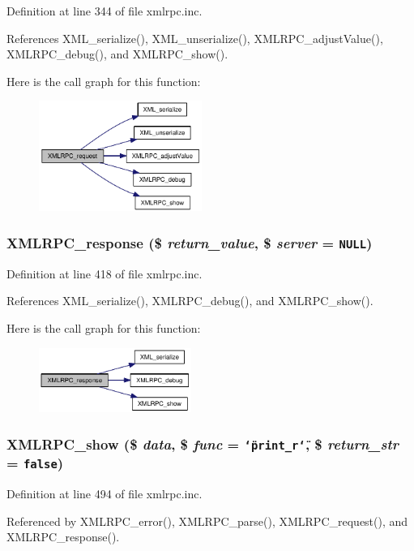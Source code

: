 Definition at line 344 of file xmlrpc.inc.

References XML\_\-serialize(), XML\_\-unserialize(), XMLRPC\_\-adjustValue(), XMLRPC\_\-debug(), and XMLRPC\_\-show().

Here is the call graph for this function:\nopagebreak
\begin{figure}[H]
\begin{center}
\leavevmode
\includegraphics[width=151pt]{xmlrpc_8inc_3a98b6984b8ca01752d1aa9a267526a3_cgraph}
\end{center}
\end{figure}
\hypertarget{xmlrpc_8inc_c736d378caaccdd0726ea1080d1f526f}{
\subsubsection{\setlength{\rightskip}{0pt plus 5cm}XMLRPC\_\-response (\$ {\em return\_\-value}, \$ {\em server} = {\tt NULL})}}
\label{xmlrpc_8inc_c736d378caaccdd0726ea1080d1f526f}




Definition at line 418 of file xmlrpc.inc.

References XML\_\-serialize(), XMLRPC\_\-debug(), and XMLRPC\_\-show().

Here is the call graph for this function:\nopagebreak
\begin{figure}[H]
\begin{center}
\leavevmode
\includegraphics[width=141pt]{xmlrpc_8inc_c736d378caaccdd0726ea1080d1f526f_cgraph}
\end{center}
\end{figure}
\hypertarget{xmlrpc_8inc_1f60d2672bcb35f5ff908f64931f8d48}{
\subsubsection{\setlength{\rightskip}{0pt plus 5cm}XMLRPC\_\-show (\$ {\em data}, \$ {\em func} = {\tt \char`\"{}print\_\-r\char`\"{}}, \$ {\em return\_\-str} = {\tt false})}}
\label{xmlrpc_8inc_1f60d2672bcb35f5ff908f64931f8d48}




Definition at line 494 of file xmlrpc.inc.

Referenced by XMLRPC\_\-error(), XMLRPC\_\-parse(), XMLRPC\_\-request(), and XMLRPC\_\-response().